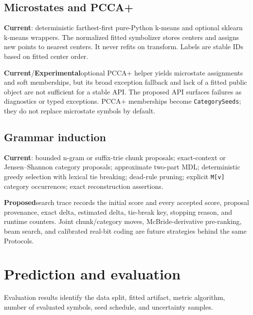 \documentclass[11pt]{article}
\newcommand{\Current}{\textbf{Current}}
\newcommand{\Proposed}{\textbf{Proposed}}
\newcommand{\Experimental}{\textbf{Experimental}}
\begin{document}
\subsection{Microstates and PCCA+}

\Current: deterministic farthest-first pure-Python k-means and optional sklearn
k-means wrappers. The normalized fitted symbolizer stores centers and assigns
new points to nearest centers. It never refits on transform. Labels are stable
IDs based on fitted center order.

\Current/\Experimental optional PCCA+ helper yields microstate assignments and
soft memberships, but its broad exception fallback and lack of a fitted public
object are not sufficient for a stable API. The proposed API surfaces failures
as diagnostics or typed exceptions. PCCA+ memberships become
\texttt{CategorySeeds}; they do not replace microstate symbols by default.

\subsection{Grammar induction}

\Current: bounded n-gram or suffix-trie chunk proposals; exact-context or
Jensen--Shannon category proposals; approximate two-part MDL; deterministic
greedy selection with lexical tie breaking; dead-rule pruning; explicit
\texttt{M[v]} category occurrences; exact reconstruction assertions.

\Proposed search trace records the initial score and every accepted score,
proposal provenance, exact delta, estimated delta, tie-break key, stopping reason,
and runtime counters. Joint chunk/category moves, McBride-derivative pre-ranking,
beam search, and calibrated real-bit coding are future strategies behind the
same Protocols.

\section{Prediction and evaluation}

Evaluation results identify the data split, fitted artifact, metric algorithm,
number of evaluated symbols, seed schedule, and uncertainty samples.
\end{document}
